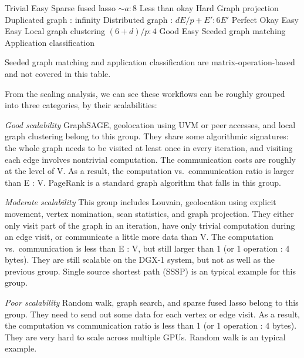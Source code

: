 \documentclass[10pt,oneside]{memoir}
\begin{document}
\textbar{} Trivial \linebreak Easy \textbar{} \textbar{} Sparse fused
lasso \textbar{} \(\sim a:8\) \textbar{} Less than okay \textbar{} Hard
\textbar{} \textbar{} Graph projection \textbar{} Duplicated graph :
infinity \linebreak Distributed graph : \(dE/p + E' : 6E'\) \textbar{}
Perfect \linebreak Okay \textbar{} Easy \linebreak Easy \textbar{}
\textbar{} Local graph clustering \textbar{} \((6 + d)/p : 4\)
\textbar{} Good \textbar{} Easy \textbar{} \textbar{} Seeded graph
matching \textbar{} \textbar{} \textbar{} \textbar{} \textbar{}
Application classification \textbar{} \textbar{} \textbar{} \textbar{}

Seeded graph matching and application classification are
matrix-operation-based and not covered in this table.

From the scaling analysis, we can see these workflows can be roughly
grouped into three categories, by their scalabilities:

\emph{Good scalability} GraphSAGE, geolocation using UVM or peer
accesses, and local graph clustering belong to this group. They share
some algorithmic signatures: the whole graph needs to be visited at
least once in every iteration, and visiting each edge involves
nontrivial computation. The communication costs are roughly at the level
of V. As a result, the computation vs.~communication ratio is larger
than E : V. PageRank is a standard graph algorithm that falls in this
group.

\emph{Moderate scalability} This group includes Louvain, geolocation
using explicit movement, vertex nomination, scan statistics, and graph
projection. They either only visit part of the graph in an iteration,
have only trivial computation during an edge visit, or communicate a
little more data than V. The computation vs.~communication is less than
E : V, but still larger than 1 (or 1 operation : 4 bytes). They are
still scalable on the DGX-1 system, but not as well as the previous
group. Single source shortest path (SSSP) is an typical example for this
group.

\emph{Poor scalability} Random walk, graph search, and sparse fused
lasso belong to this group. They need to send out some data for each
vertex or edge visit. As a result, the computation vs communication
ratio is less than 1 (or 1 operation : 4 bytes). They are very hard to
scale across multiple GPUs. Random walk is an typical example.
\end{document}
